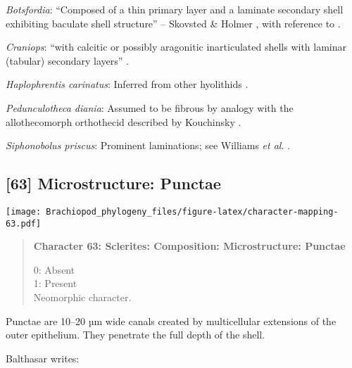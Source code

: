 \documentclass[openany]{book}
\theoremstyle{definition}
\theoremstyle{definition}
\theoremstyle{definition}
\theoremstyle{remark}
\begin{document}
\hypertarget{Botsfordia-coding-62}{}
\emph{Botsfordia}: ``Composed of a thin primary layer and a laminate
secondary shell exhibiting baculate shell structure'' -- Skovsted \&
Holmer \citeyearpar{Skovsted2005EarlyCambrian}, with reference to
\citet{Skovsted2003EarlyCambrian}.

\hypertarget{Craniops-coding-62}{}
\emph{Craniops}: ``with calcitic or possibly aragonitic inarticulated
shells with laminar (tabular) secondary layers''
\citep{Williams2000LinguliformeaCraniiformea}.

\hypertarget{Haplophrentis_carinatus-coding-62}{}
\emph{Haplophrentis carinatus}: Inferred from other hyolithids
\citep[e.g.][]{Moore2018Plywoodlike}.

\hypertarget{Pedunculotheca_diania-coding-62}{}
\emph{Pedunculotheca diania}: Assumed to be fibrous by analogy with the
allothecomorph orthothecid described by Kouchinsky
\citeyearpar{Kouchinsky2000Skeletalmicrostructures}.

\hypertarget{Siphonobolus_priscus-coding-62}{}
\emph{Siphonobolus priscus}: Prominent laminations; see Williams
\emph{et al}. \citeyearpar{Williams2004Chemicostructure}.

\subsection*{{[}63{]} Microstructure:
Punctae}\label{microstructure-punctae}

\texttt{[image: Brachiopod\_phylogeny\_files/figure-latex/character-mapping-63.pdf]}

\begin{quote}
\textbf{Character 63: Sclerites: Composition: Microstructure: Punctae}

0: Absent\\
1: Present\\
Neomorphic character.
\end{quote}

Punctae are 10--20 µm wide canals created by multicellular extensions of
the outer epithelium. They penetrate the full depth of the shell.

Balthasar \citeyearpar{Balthasar2008iMummpikia} writes:
\end{document}
